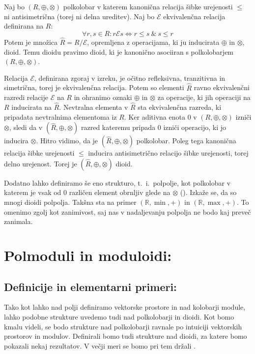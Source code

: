 \documentclass[mat1]{fmfdelo}
\newcommand{\R}{\mathbb{R}}
\begin{document}
\begin{trditev}
	Naj bo $(R, \oplus, \otimes)$ polkolobar v katerem kanonična relacija šibke urejenosti  $\leq$ ni antisimetrična (torej ni delna ureditev). Naj bo $\mathcal{E}$ ekvivalenčna relacija definirana na $R$:
$$\forall r, s\in R: r\mathcal{E}s \iff r\leq s ~\&~ s \leq r$$
	Potem je množica $\widehat{R} = R / \mathcal{E}$, opremljena z operacijama, ki ju inducirata $\oplus$ in $\otimes$, dioid. Temu dioidu pravimo dioid, ki je kanonično asociiran s polkolobarjem $(R, \oplus, \otimes)$.
\end{trditev}
\begin{dokaz}
	Relacija $\mathcal{E}$, definirana zgoraj v izreku, je očitno refleksivna, tranzitivna in simetrična, torej je ekvivalenčna relacija. Potem so elementi $\widehat{R}$ ravno ekvivalenčni razredi relacije $\mathcal{E}$ na $R$ in ohranimo oznaki $\oplus$ in $\otimes$ za operacije, ki jih operaciji na $R$ inducirata na $\widehat{R}$. Nevtralna elementa v $\widehat{R}$ sta ekvivalenčna razreda, ki pripadata nevtralnima elementoma iz $R$. Ker aditivna enota $0$ v $(R, \oplus, \otimes)$ izniči $\otimes$, sledi da v $(\widehat{R}, \oplus, \otimes)$ razred kateremu pripada $0$ izniči operacijo, ki jo inducira $\otimes$. Hitro vidimo, da je $(\widehat{R}, \oplus, \otimes)$ polkolobar. Poleg tega kanonična relacija šibke urejenosti $\leq$ inducira antisimetrično relacijo šibke urejenosti, torej delno urejenost. Torej je $(\widehat{R}, \oplus, \otimes)$ dioid.
\end{dokaz}
\begin{opomba}
	Dodatno lahko definiramo še eno strukturo, t.~i.~polpolje, kot polkolobar v katerem je vsak od $0$ različen element obrnljiv glede na $\otimes$ (\cite[poglavje 1, definicija 5.\,2.\,3.\,]{bib:Gondran}). Izkaže se, da so mnogi dioidi polpolja. Takšna sta na primer $(\R, \min, +)$ in $(\R, \max, +)$. To omenimo zgolj kot zanimivost, saj nas v nadaljevanju polpolja ne bodo kaj preveč zanimala.
\end{opomba}

\section{Polmoduli in moduloidi:}
\subsection{Definicije in elementarni primeri:}
Tako kot lahko nad polji definiramo vektorske prostore in nad kolobarji module, lahko podobne strukture uvedemo tudi nad polkolobarji in dioidi. Kot bomo kmalu videli, se bodo strukture nad polkolobarji ravnale po intuiciji vektorskih prostorov in modulov. Definirali bomo tudi strukture nad dioidi, za katere bomo pokazali nekaj rezultatov. V večji meri se bomo pri tem držali \cite[poglavje 5.\,2.\,]{bib:Gondran}.
\end{document}
